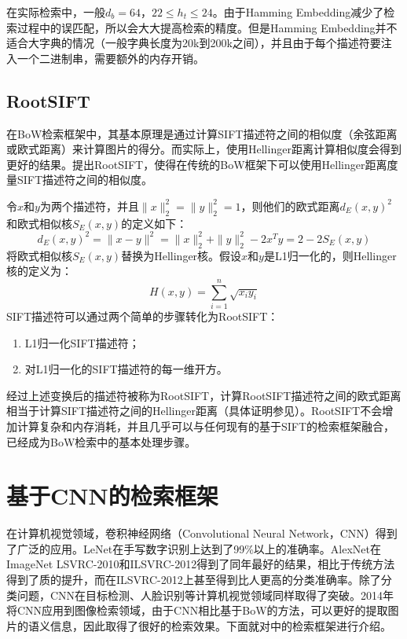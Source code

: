 在实际检索中，一般$d_b = 64$，$22 \le h_t \le 24$。由于Hamming Embedding减少了检索过程中的误匹配，所以会大大提高检索的精度。但是Hamming Embedding并不适合大字典的情况（一般字典长度为20k到200k之间），并且由于每个描述符要注入一个二进制串，需要额外的内存开销。

\subsection{RootSIFT}
在BoW检索框架中，其基本原理是通过计算SIFT描述符之间的相似度（余弦距离或欧式距离）来计算图片的得分。而实际上，使用Hellinger距离计算相似度会得到更好的结果。\cite{arandjelovic2012three}提出RootSIFT，使得在传统的BoW框架下可以使用Hellinger距离度量SIFT描述符之间的相似度。

令$x$和$y$为两个描述符，并且$\parallel x \parallel^2_2 = \parallel y \parallel^2_2 = 1$，则他们的欧式距离$d_E(x,y)^2$和欧式相似核$S_E(x,y)$的定义如下：
\begin{equation}
d_E(x,y)^2 = \parallel x-y \parallel^2 = \parallel x \parallel^2_2 + \parallel y \parallel^2_2 - 2x^Ty = 2 - 2S_E(x,y)
\end{equation}
\cite{arandjelovic2012three}将欧式相似核$S_E(x,y)$替换为Hellinger核。假设$x$和$y$是L1归一化的，则Hellinger核的定义为：
\begin{equation}
H(x,y) = \sum_{i=1}^{n}\sqrt{x_iy_i}
\end{equation}
SIFT描述符可以通过两个简单的步骤转化为RootSIFT：
\begin{enumerate}
	\item L1归一化SIFT描述符；
	\item 对L1归一化的SIFT描述符的每一维开方。
\end{enumerate}

经过上述变换后的描述符被称为RootSIFT，计算RootSIFT描述符之间的欧式距离相当于计算SIFT描述符之间的Hellinger距离（具体证明参见\cite{arandjelovic2012three}）。RootSIFT不会增加计算复杂和内存消耗，并且几乎可以与任何现有的基于SIFT的检索框架融合，已经成为BoW检索中的基本处理步骤。

\section{基于CNN的检索框架}
在计算机视觉领域，卷积神经网络（Convolutional Neural Network，CNN）得到了广泛的应用\cite{zhang2015bit}\cite{hu2014discriminative}\cite{schroff2015facenet}\cite{hariharan2015hypercolumns}\cite{papandreou2015modeling}\cite{yuting2015improving}\cite{lenc2014understanding}\cite{nguyen2014deep}。LeNet\cite{lecun1998Gradient}在手写数字识别上达到了99\%以上的准确率。AlexNet\cite{krizhevsky2012imagenet}在ImageNet LSVRC-2010和ILSVRC-2012得到了同年最好的结果，相比于传统方法得到了质的提升，而\cite{he2015delving}在ILSVRC-2012上甚至得到比人更高的分类准确率。除了分类问题，CNN在目标检测\cite{Girshick2014Rich}\cite{girshick2015fast}\cite{ren2015faster}、人脸识别等计算机视觉领域同样取得了突破。2014年\cite{babenko2014neural}将CNN应用到图像检索领域，由于CNN相比基于BoW的方法，可以更好的提取图片的语义信息，因此\cite{babenko2014neural}取得了很好的检索效果。下面就对\cite{babenko2014neural}中的检索框架进行介绍。

